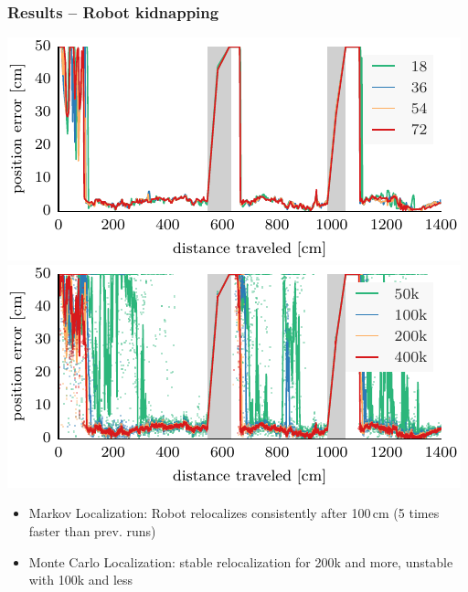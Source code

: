 \documentclass[lualatex,aspectratio=169,xcolor=dvipsnames,10pt,c]{beamer}
\begin{document}
\frame
{
	\frametitle{Results – Robot kidnapping}
	
	
	\hfill
	
	{\footnotesize
	\makebox[.5\textwidth][c]{\textcolor{gray}{varying number of discretization angles}}\hfill
	\makebox[.5\textwidth][c]{\textcolor{gray}{varying number of particles}}
	}
	
	\includegraphics[width=.48\columnwidth]{ml-whole_random_long-xy} \hfill
	\includegraphics[width=.48\columnwidth]{mcl-whole_random_long-xy}
	
	\vspace{1em}

	\begin{itemize}
	\item Markov Localization: Robot relocalizes consistently after 100\,cm (5 times faster than prev. runs)
	\item Monte Carlo Localization: stable relocalization for 200k and more, unstable with 100k and less
	\end{itemize}
}
\end{document}

